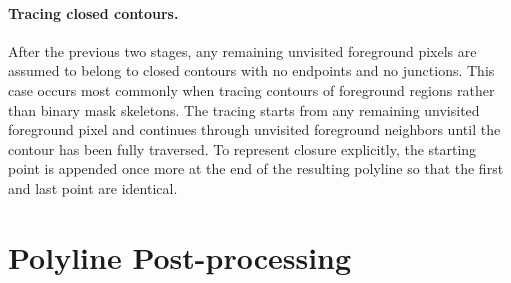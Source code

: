 \paragraph{Tracing closed contours.}
After the previous two stages, any remaining unvisited foreground pixels are assumed to belong to closed contours with no endpoints and no junctions. This case occurs most commonly when tracing contours of foreground regions rather than binary mask skeletons. The tracing starts from any remaining unvisited foreground pixel and continues through unvisited foreground neighbors until the contour has been fully traversed. To represent closure explicitly, the starting point is appended once more at the end of the resulting polyline so that the first and last point are identical.







\section{Polyline Post-processing}

